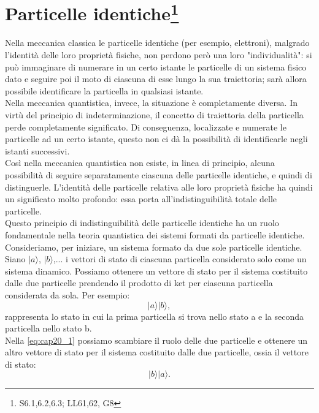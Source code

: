 \chapter[Particelle identiche]{Particelle identiche\footnote{S6.1,6.2,6.3; LL61,62, G8}}
Nella meccanica classica le particelle identiche (per esempio, elettroni), malgrado l'identità delle loro proprietà fisiche, non perdono però una loro "individualità": si può immaginare di numerare in un certo istante le particelle di un sistema fisico dato e seguire poi il moto di ciascuna di esse lungo la sua traiettoria; sarà allora possibile identificare la particella in qualsiasi istante.\\ 
Nella meccanica quantistica, invece, la situazione \`e completamente diversa. In virtù del principio di indeterminazione, il concetto di traiettoria della particella perde completamente significato. Di conseguenza, localizzate e numerate le particelle ad un certo istante, questo non ci dà la possibilità di identificarle negli istanti successivi.\\
Cos\`i nella meccanica quantistica non esiste, in linea di principio, alcuna possibilità di seguire separatamente ciascuna delle particelle identiche, e quindi di distinguerle. L'identità delle particelle relativa alle loro proprietà fisiche ha quindi un significato molto profondo: essa porta all'indistinguibilità totale delle particelle.\\
Questo principio di indistinguibilità delle particelle identiche ha un ruolo fondamentale nella teoria quantistica dei sistemi formati da particelle identiche.\\
Consideriamo, per iniziare, un sistema formato da due sole particelle identiche. Siano $|a\rangle$, $|b\rangle$,... i vettori di stato di ciascuna particella considerato solo come un sistema dinamico. Possiamo ottenere un vettore di stato per il sistema costituito dalle due particelle prendendo il prodotto di ket per ciascuna particella considerata da sola. Per esempio:
\begin{equation}
|a\rangle|b\rangle,
\label{eq:cap20_1}
\end{equation}
rappresenta lo stato in cui la prima particella si trova nello stato a e la seconda particella nello stato b.\\
Nella \ref{eq:cap20_1} possiamo scambiare il ruolo delle due particelle e ottenere un altro vettore di stato per il sistema costituito dalle due particelle, ossia il vettore di stato:\\
\begin{equation}
|b\rangle|a\rangle.
\label{eq:cap20_2}
\end{equation}

